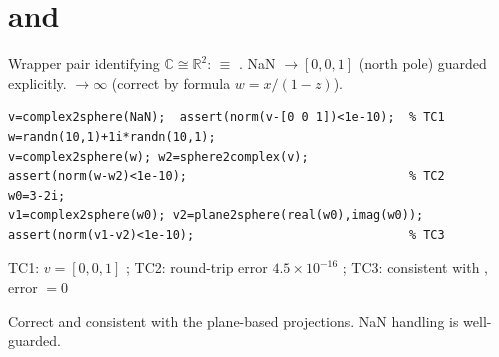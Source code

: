 \chapter{ and }
\begin{tcolorbox}[Abox,title={Analysis}]
Wrapper pair identifying $\mathbb{C}\cong\mathbb{R}^2$:  $\equiv$ . NaN $\to [0,0,1]$ (north pole) guarded explicitly.  $\to\infty$ (correct by formula $w=x/(1-z)$).
\end{tcolorbox}
\begin{lstlisting}[caption={Tests for complex2sphere.m / sphere2complex.m}]
v=complex2sphere(NaN);  assert(norm(v-[0 0 1])<1e-10);  % TC1
w=randn(10,1)+1i*randn(10,1);
v=complex2sphere(w); w2=sphere2complex(v);
assert(norm(w-w2)<1e-10);                               % TC2
w0=3-2i;
v1=complex2sphere(w0); v2=plane2sphere(real(w0),imag(w0));
assert(norm(v1-v2)<1e-10);                              % TC3
\end{lstlisting}
\begin{tcolorbox}[Pbox,title={TC1--TC3 -- All pass}]
TC1: $v=[0,0,1]$ \APROVADO; TC2: round-trip error $4.5\times10^{-16}$ \APROVADO; TC3: consistent with , error $=0$ \APROVADO
\end{tcolorbox}
\begin{concl}
Correct and consistent with the plane-based projections. NaN handling is well-guarded.
\end{concl}

